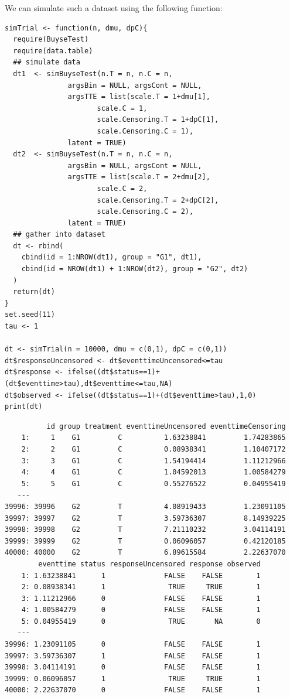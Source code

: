 \documentclass[12pt]{article}
\begin{document}
\clearpage

We can simulate such a dataset using the following function:
\lstset{language=r,label= ,caption= ,captionpos=b,numbers=none}
\begin{lstlisting}
simTrial <- function(n, dmu, dpC){
  require(BuyseTest)
  require(data.table)
  ## simulate data
  dt1  <- simBuyseTest(n.T = n, n.C = n, 
		       argsBin = NULL, argsCont = NULL, 
		       argsTTE = list(scale.T = 1+dmu[1],
				      scale.C = 1,
				      scale.Censoring.T = 1+dpC[1],
				      scale.Censoring.C = 1),
		       latent = TRUE)
  dt2  <- simBuyseTest(n.T = n, n.C = n, 
		       argsBin = NULL, argsCont = NULL, 
		       argsTTE = list(scale.T = 2+dmu[2],
				      scale.C = 2,
				      scale.Censoring.T = 2+dpC[2],
				      scale.Censoring.C = 2),
		       latent = TRUE)
  ## gather into dataset
  dt <- rbind(
    cbind(id = 1:NROW(dt1), group = "G1", dt1),
    cbind(id = NROW(dt1) + 1:NROW(dt2), group = "G2", dt2)
  )
  return(dt)
}
set.seed(11)
tau <- 1

dt <- simTrial(n = 10000, dmu = c(0,1), dpC = c(0,1))
dt$responseUncensored <- dt$eventtimeUncensored<=tau
dt$response <- ifelse((dt$status==1)+(dt$eventtime>tau),dt$eventtime<=tau,NA)
dt$observed <- ifelse((dt$status==1)+(dt$eventtime>tau),1,0)
print(dt)
\end{lstlisting}

\begin{verbatim}
          id group treatment eventtimeUncensored eventtimeCensoring
    1:     1    G1         C          1.63238841         1.74283865
    2:     2    G1         C          0.08938341         1.10407172
    3:     3    G1         C          1.54194414         1.11212966
    4:     4    G1         C          1.04592013         1.00584279
    5:     5    G1         C          0.55276522         0.04955419
   ---                                                             
39996: 39996    G2         T          4.08919433         1.23091105
39997: 39997    G2         T          3.59736307         8.14939225
39998: 39998    G2         T          7.21110232         3.04114191
39999: 39999    G2         T          0.06096057         0.42120185
40000: 40000    G2         T          6.89615584         2.22637070
        eventtime status responseUncensored response observed
    1: 1.63238841      1              FALSE    FALSE        1
    2: 0.08938341      1               TRUE     TRUE        1
    3: 1.11212966      0              FALSE    FALSE        1
    4: 1.00584279      0              FALSE    FALSE        1
    5: 0.04955419      0               TRUE       NA        0
   ---                                                       
39996: 1.23091105      0              FALSE    FALSE        1
39997: 3.59736307      1              FALSE    FALSE        1
39998: 3.04114191      0              FALSE    FALSE        1
39999: 0.06096057      1               TRUE     TRUE        1
40000: 2.22637070      0              FALSE    FALSE        1
\end{verbatim}
\end{document}
